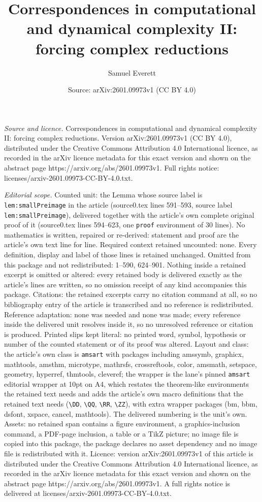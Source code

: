 \documentclass[10pt,a4paper]{amsart}
\title[Correspondences in computational and dynamical complexity II]{Correspondences in computational and dynamical complexity II: forcing complex reductions}
\author{Samuel Everett}
\date{Source: arXiv:2601.09973v1 (CC BY 4.0)}
\begin{document}
\maketitle

\noindent\emph{Source and licence.} Correspondences in computational and dynamical complexity II: forcing complex reductions. Version arXiv:2601.09973v1 (CC BY 4.0), distributed under the Creative Commons Attribution 4.0 International licence, as recorded in the arXiv licence metadata for this exact version and shown on the abstract page https://arxiv.org/abs/2601.09973v1. Full rights notice: licenses/arxiv-2601.09973-CC-BY-4.0.txt.\par\smallskip

\noindent\textit{Editorial scope.} Counted unit: the Lemma whose source label is \texttt{lem:smallPreimage} in the article (source0.tex lines 591--593, source label \texttt{lem:smallPreimage}), delivered together with the article's own complete original proof of it (source0.tex lines 594--623, one \texttt{proof} environment of 30 lines). No mathematics is written, repaired or re-derived: statement and proof are the article's own text line for line. Required context retained uncounted: none. Every definition, display and label of those lines is retained unchanged. Omitted from this package and not redistributed: 1--590, 624--901. Nothing inside a retained excerpt is omitted or altered: every retained body is delivered exactly as the article's lines are written, so no omission receipt of any kind accompanies this package. Citations: the retained excerpts carry no citation command at all, so no bibliography entry of the article is transcribed and no reference is redistributed. Reference adaptation: none was needed and none was made; every reference inside the delivered unit resolves inside it, so no unresolved reference or citation is produced. Printed slips kept literal: no printed word, symbol, hypothesis or number of the counted statement or of its proof was altered. Layout and class: the article's own class is \texttt{amsart} with packages including amssymb, graphicx, mathtools, amsthm, microtype, mathrsfs, crossreftools, color, amsmath, setspace, geometry, hyperref, thmtools, cleveref; the wrapper is the lane's pinned \texttt{amsart} editorial wrapper at 10pt on A4, which restates the theorem-like environments the retained text needs and adds the article's own macro definitions that the retained text needs (\texttt{\textbackslash DD}, \texttt{\textbackslash QQ}, \texttt{\textbackslash RR}, \texttt{\textbackslash ZZ}), with extra wrapper packages (bm, bbm, dsfont, xspace, cancel, mathtools). The delivered numbering is the unit's own. Assets: no retained span contains a figure environment, a graphics-inclusion command, a PDF-page inclusion, a table or a TikZ picture; no image file is copied into this package, the package declares no asset dependency and no image file is redistributed with it. Licence: version arXiv:2601.09973v1 of this article is distributed under the Creative Commons Attribution 4.0 International licence, as recorded in the arXiv licence metadata for this exact version and shown on the abstract page https://arxiv.org/abs/2601.09973v1. A full rights notice is delivered at licenses/arxiv-2601.09973-CC-BY-4.0.txt. 
\end{document}
